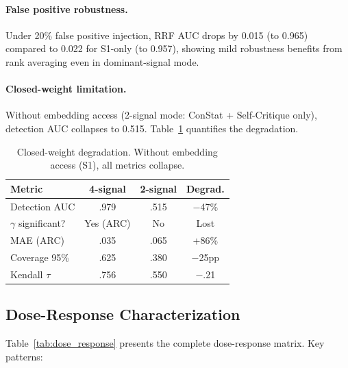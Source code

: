 \documentclass[11pt,a4paper]{article}
\begin{document}
\paragraph{False positive robustness.} Under 20\% false positive injection, RRF AUC drops by 0.015 (to 0.965) compared to 0.022 for S1-only (to 0.957), showing mild robustness benefits from rank averaging even in dominant-signal mode.

\paragraph{Closed-weight limitation.} Without embedding access (2-signal mode: ConStat + Self-Critique only), detection AUC collapses to 0.515. Table~\ref{tab:closed_weight} quantifies the degradation.

\begin{table}[t]
\centering
\small
\caption{Closed-weight degradation. Without embedding access (S1), all metrics collapse.}
\label{tab:closed_weight}
\begin{tabular}{lccc}
\toprule
Metric & 4-signal & 2-signal & Degrad. \\
\midrule
Detection AUC & .979 & .515 & $-$47\% \\
$\gamma$ significant? & Yes (ARC) & No & Lost \\
MAE (ARC) & .035 & .065 & +86\% \\
Coverage 95\% & .625 & .380 & $-$25pp \\
Kendall $\tau$ & .756 & .550 & $-$.21 \\
\bottomrule
\end{tabular}
\end{table}

\subsection{Dose-Response Characterization}
\label{sec:dose_response}

Table~\ref{tab:dose_response} presents the complete dose-response matrix. Key patterns:
\end{document}

